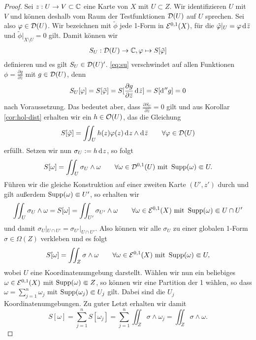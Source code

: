 \begin{proof}
  Sei $z: U \rightarrow V \subset \mathbb{C}$ eine Karte von $X$ mit $U \subset
  Z$. Wir identifizieren $U$ mit $V$ und können deshalb vom Raum der
  Testfunktionen $\mathcal{D}(U)$ auf $U$ sprechen. Sei also $\varphi \in
  \mathcal{D}(U)$. Wir bezeichnen mit $\tilde \phi$ jede 1-Form in
  $\mathcal{E}^{0,1}(X)$, für die $\tilde \phi|_U = \phi \d[\bar z]$ und
  $\tilde \phi |_{X \setminus U} = 0$ gilt. 
  Damit können wir 
  \begin{align}
  S_U: \mathcal{D}(U) \rightarrow \mathbb{C}, \varphi \mapsto S[\tilde {\varphi}] \label{eq:su}
  \end{align}
  definieren und es gilt $S_U \in \mathcal{D}(U)'$.
  \eqref{eq:su} verschwindet auf allen Funktionen $\phi = \frac{\partial
    g}{\partial \bar z}$ mit $g \in \mathcal{D}(U)$, denn
  \[
  S_U[\phi] = S[\tilde \phi] = S[ \frac{\partial g}{\partial \bar z}
  \d[\bar z]] = S[\d[''g]] = 0
  \]
  nach Voraussetzung. Das bedeutet aber, dass
  $\frac{\partial S_U}{\partial \bar z} = 0$ gilt und aus Korollar
  \ref{cor:hol-dist} erhalten wir ein $h \in \mathcal{O}(U)$, das die Gleichung
  \[
  S[\tilde \phi] = \iint_U h(z) \phi(z) \d[z] \wedge \d[\bar z] \qquad
  \forall \phi \in \dist(U)
  \]
  erfüllt. Setzen wir nun $\sigma_U := h \d[z]$, so folgt
  \[
  S[\omega] = \iint_U \sigma_U \wedge \omega \qquad \forall \omega \in
  \mathcal{D}^{0,1}(U) \text{ mit } \operatorname{Supp}(\omega) \Subset U.
  \]
  Führen wir die gleiche Konstruktion auf einer zweiten Karte $(U', z')$
  durch und gilt außerdem $\operatorname{Supp}(\omega) \Subset U'$, so
  erhalten wir
  \[
  \iint_U \sigma_U \wedge \omega = S[\omega] = \iint_{U'} \sigma_{U'}
  \wedge \omega \qquad \forall \omega \in \mathcal{E}^{0,1}(X) \text{ mit }
  \operatorname{Supp}(\omega) \Subset U \cap U'
  \]
  und damit $\sigma_U|_{U \cap U'} = \sigma_{U'}|_{U \cap
    U'}$. Also können wir alle $\sigma_U$ zu einer globalen 1-Form
  \break$\sigma \in \Omega(Z)$ verkleben und es folgt
  \[
  S[\omega] = \iint_Z \sigma \wedge \omega \qquad \forall \omega \in
  \mathcal{E}^{0,1}(X) \text{ mit } \operatorname{Supp}(\omega) \Subset U,
  \]
  wobei $U$ eine Koordinatenumgebung darstellt. 
  Wählen wir nun ein beliebiges $\omega \in \mathcal{E}^{0,1}(X)$ mit
  $\operatorname{Supp}(\omega) \Subset Z$, so können wir eine Partition der 1
  wählen, so dass $\omega = \sum_{j=1}^n \omega_j$ mit
  $\operatorname{Supp}(\omega_j) \Subset U_j$ gilt. Dabei sind die $U_j$
  Koordinatenumgebungen. 
  Zu guter Letzt erhalten wir damit
  \[
  S[\omega] = \sum_{j=1}^n S[\omega_j] = \sum_{j=1}^n \iint_Z \sigma
  \wedge \omega_j = \iint_Z \sigma \wedge \omega.
  \]
\end{proof}

